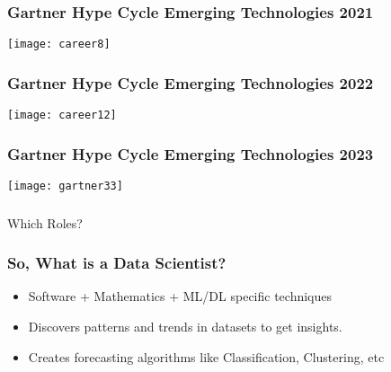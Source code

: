 \begin{frame}[fragile]\frametitle{Gartner Hype Cycle Emerging Technologies 2021}
	
	\begin{center}
	\texttt{[image: career8]}
	\end{center}

\end{frame}

\begin{frame}[fragile]\frametitle{Gartner Hype Cycle Emerging Technologies 2022}
	
	\begin{center}
	\texttt{[image: career12]}
	\end{center}

\end{frame}

\begin{frame}[fragile]\frametitle{Gartner Hype Cycle Emerging Technologies 2023}
	
	\begin{center}
	\texttt{[image: gartner33]}
	\end{center}

\end{frame}

\begin{frame}[fragile]\frametitle{}
\begin{center}
{\Large Which Roles?}
\end{center}
\end{frame}

\begin{frame}[fragile]\frametitle{So, What is a Data Scientist?}
\begin{itemize}
\item Software + Mathematics + ML/DL specific techniques
\item Discovers patterns and trends in datasets to get insights.
\item Creates forecasting algorithms like Classification, Clustering, etc
\end{itemize}
\end{frame}

